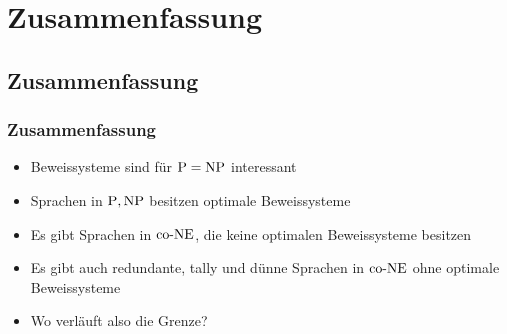 \section{Zusammenfassung} 
\subsection{Zusammenfassung}

\begin{frame}
  \frametitle{Zusammenfassung}

  \begin{itemize}
   \item<1-> Beweissysteme sind für \(\text{P} = \text{NP}\) interessant
   \item<2-> Sprachen in \(\text{P}, \text{NP}\) besitzen optimale Beweissysteme
   \item<3-> Es gibt Sprachen in \(\text{co-NE}\), die keine optimalen Beweissysteme besitzen
   \item<4-> Es gibt auch redundante, tally und dünne Sprachen in \(\text{co-NE}\) ohne optimale Beweissysteme
   \item<5-> Wo verläuft also die Grenze?
  \end{itemize}

\end{frame}
